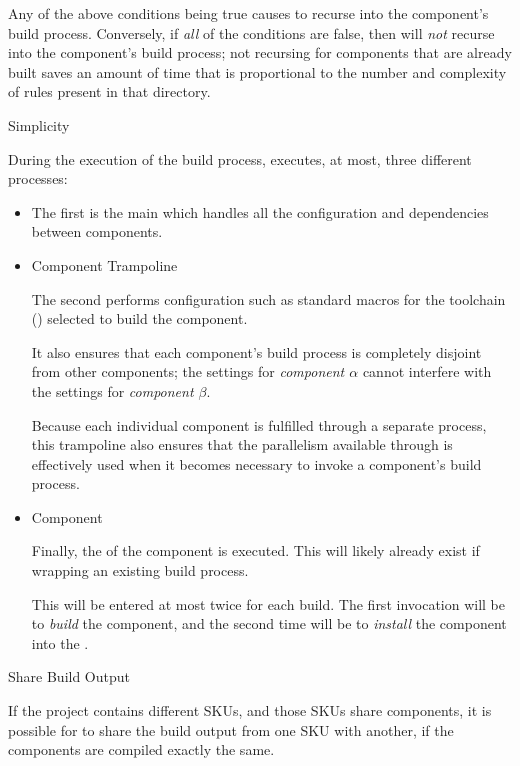 \begin{description}
  Any of the above conditions being true causes \lmsbw to recurse into
  the component's build process.  Conversely, if \emph{all} of the
  conditions are false, then \lmsbw will \emph{not} recurse into the
  component's build process; not recursing for components that are
  already built saves an amount of time that is proportional to the
  number and complexity of \make rules present in that directory.

\item \makefile Simplicity

  During the execution of the build process, \lmsbw executes, at most,
  three different \makefile processes:

  \begin{itemize}
  \item \lmsbw \makefile

    The first is the main \lmsbw \makefile which handles all the
    configuration and dependencies between components.

  \item Component Trampoline \makefile

    The second \makefile performs configuration such as standard
    macros for the toolchain ()
    selected to build the component.

    It also ensures that each component's build process is completely
    disjoint from other components; the settings for \emph{component
      $\alpha$} cannot interfere with the settings for \emph{component
      $\beta$}.

    Because each individual component is fulfilled through a separate
    \make process, this trampoline also ensures that the parallelism
    available through \gnumake is effectively used when it becomes
    necessary to invoke a component's build process.

  \item Component \makefile

    Finally, the \makefile of the component is executed.  This will
    likely already exist if wrapping an existing build process.

    This \makefile will be entered at most twice for each build.  The
    first invocation will be to \emph{build} the component, and the
    second time will be to \emph{install} the component into the
    \destdir.
\end{itemize}

\item Share Build Output

  If the project contains different SKUs, and those SKUs share
  components, it is possible for \lmsbw to share the build output from
  one SKU with another, if the components are compiled exactly the
  same.

\end{description}

